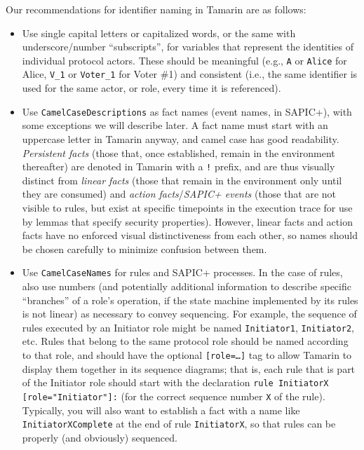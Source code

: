 Our recommendations for identifier naming in Tamarin are as follows:
\begin{itemize}

\item Use single capital letters or capitalized words, or the same with underscore/number ``subscripts'', for variables that represent the identities of individual protocol actors. These should be meaningful (e.g., \texttt{A} or \texttt{Alice} for Alice, \texttt{V\_1} or \texttt{Voter\_1} for Voter \#1) and consistent (i.e., the same identifier is used for the same actor, or role, every time it is referenced). 

\item Use \texttt{CamelCaseDescriptions} as fact names (event names, in SAPIC+), with some exceptions we will describe later. A fact name must start with an uppercase letter in Tamarin anyway, and camel case has good readability. \emph{Persistent facts} (those that, once established, remain in the environment thereafter) are denoted in Tamarin with a \texttt{!} prefix, and are thus visually distinct from \emph{linear facts} (those that remain in the environment only until they are consumed) and \emph{action facts}/\emph{SAPIC+ events} (those that are not visible to rules, but exist at specific timepoints in the execution trace for use by lemmas that specify security properties). However, linear facts and action facts have no enforced visual distinctiveness from each other, so names should be chosen carefully to minimize confusion between them.

\item Use \texttt{CamelCaseNames} for rules and SAPIC+ processes. In the case of rules, also use numbers (and potentially additional information to describe specific ``branches'' of a role's operation, if the state machine implemented by its rules is not linear) as necessary to convey sequencing. For example, the sequence of rules executed by an Initiator role might be named \texttt{Initiator1}, \texttt{Initiator2}, etc. Rules that belong to the same protocol role should be named according to that role, and should have the optional \texttt{[role=\ldots]} tag to allow Tamarin to display them together in its sequence diagrams; that is, each rule that is part of the Initiator role should start with the declaration \texttt{rule InitiatorX [role="Initiator"]:} (for the correct sequence number \texttt{X} of the rule). Typically, you will also want to establish a fact with a name like \texttt{InitiatorXComplete} at the end of rule \texttt{InitiatorX}, so that rules can be properly (and obviously) sequenced.


\end{itemize}
